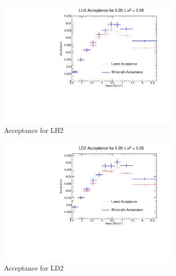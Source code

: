 \documentclass[11pt]{article}
\begin{document}
\begin{figure}[p]
    \centering
    \begin{subfigure}[b]{0.48\textwidth}
       \includegraphics[width=\linewidth]{./acceptancePlots/LH2_acceptance_xF_bin_4.pdf}
       \caption{Acceptance for LH2}
    \end{subfigure}\hfill
    \begin{subfigure}[b]{0.48\textwidth}
       \includegraphics[width=\linewidth]{./acceptancePlots/LD2_acceptance_xF_bin_4.pdf}
       \caption{Acceptance for LD2}
    \end{subfigure}
    \begin{subfigure}[b]{0.48\textwidth}

\end{subfigure}
\end{figure}
\end{document}
